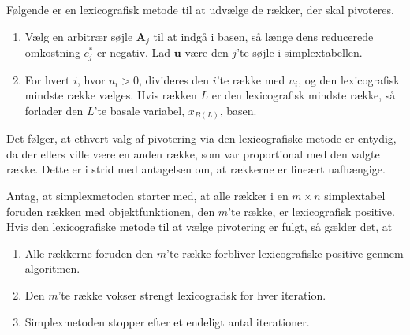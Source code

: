 %
Følgende er en lexicografisk metode til at udvælge de rækker, der skal pivoteres.
\begin{enumerate}
\item Vælg en arbitrær søjle $\textbf{A}_j$ til at indgå i basen, så længe dens reducerede omkostning $c_j^*$ er negativ.
Lad $\textbf{u}$ være den $j$'te søjle i simplextabellen.
\item For hvert $i$, hvor $u_i>0$, divideres den $i$'te række med $u_i$, og den lexicografisk mindste række vælges. 
Hvis rækken $L$ er den lexicografisk mindste række, så forlader den $L$'te basale variabel, $x_{B(L)}$, basen.
\end{enumerate}
%
Det følger, at ethvert valg af pivotering via den lexicografiske metode er entydig, da der ellers ville være en anden række, som var proportional med den valgte række. 
Dette er i strid med antagelsen om, at rækkerne er lineært uafhængige.
%
\begin{thm}{}{}
Antag, at simplexmetoden starter med, at alle rækker i en $m \times n$ simplextabel foruden rækken med objektfunktionen, den $m$'te række, er lexicografisk positive.
Hvis den lexicografiske metode til at vælge pivotering er fulgt, så gælder det, at
%
\begin{enumerate}[label=(\alph*)]
\item Alle rækkerne foruden den $m$'te række forbliver lexicografiske positive gennem algoritmen.
\item Den $m$'te række vokser strengt lexicografisk for hver iteration.
\item Simplexmetoden stopper efter et endeligt antal iterationer. 
\end{enumerate}
\end{thm}
%
